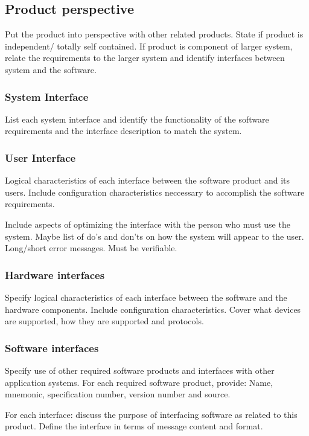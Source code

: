\documentclass[12pt]{article}
\begin{document}
     \subsection{Product perspective}
     Put the product into perspective with other related products. State if product is independent/ totally self contained. If product is component of larger system, relate the requirements to the larger system and identify interfaces between system and the software.

          \subsubsection{System Interface}
	  List each system interface and identify the functionality of the software requirements and the interface description to match the system.
	  
	  \subsubsection{User Interface}
	  Logical characteristics of each interface between the software product and its users. Include configuration characteristics neccessary to accomplish the software requirements.
	  
	  Include aspects of optimizing the interface with the person who must use the system. Maybe list of do's and don'ts on how the system will appear to the user. Long/short error messages. Must be verifiable. 
	  
	  \subsubsection{Hardware interfaces}
	  Specify logical characteristics of each interface between the software and the hardware components. Include configuration characteristics. Cover what devices are supported, how they are supported and protocols.
	  
	  \subsubsection{Software interfaces}
	  Specify use of other required software products and interfaces with other application systems. For each required software product, provide: Name, mnemonic, specification number, version number and source.

	  For each interface: discuss the purpose of interfacing software as related to this product. Define the interface in terms of message content and format. 
\end{document}
